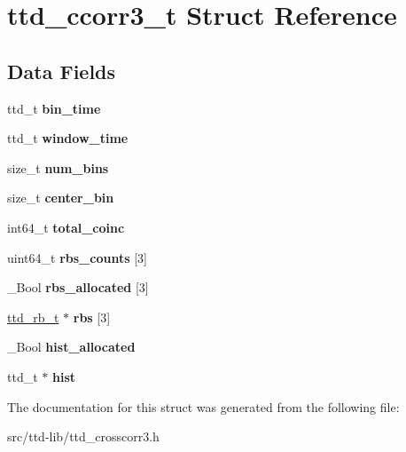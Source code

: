 \hypertarget{structttd__ccorr3__t}{}\section{ttd\+\_\+ccorr3\+\_\+t Struct Reference}
\label{structttd__ccorr3__t}
\subsection*{Data Fields}
\begin{DoxyCompactItemize}
\item 
\hypertarget{structttd__ccorr3__t_a1b78bd602c9780771a731ff59b39e214}{}ttd\+\_\+t {\bfseries bin\+\_\+time}\label{structttd__ccorr3__t_a1b78bd602c9780771a731ff59b39e214}

\item 
\hypertarget{structttd__ccorr3__t_ab3fdd8df8049f1fab663a27a9b4acfbb}{}ttd\+\_\+t {\bfseries window\+\_\+time}\label{structttd__ccorr3__t_ab3fdd8df8049f1fab663a27a9b4acfbb}

\item 
\hypertarget{structttd__ccorr3__t_a1fe4cf804dcccb4879c1834cbfd13d9c}{}size\+\_\+t {\bfseries num\+\_\+bins}\label{structttd__ccorr3__t_a1fe4cf804dcccb4879c1834cbfd13d9c}

\item 
\hypertarget{structttd__ccorr3__t_a932f1073e41399d43d4910d67677276d}{}size\+\_\+t {\bfseries center\+\_\+bin}\label{structttd__ccorr3__t_a932f1073e41399d43d4910d67677276d}

\item 
\hypertarget{structttd__ccorr3__t_a7808ee4e7455c7b5aad4f2c277cd69e3}{}int64\+\_\+t {\bfseries total\+\_\+coinc}\label{structttd__ccorr3__t_a7808ee4e7455c7b5aad4f2c277cd69e3}

\item 
\hypertarget{structttd__ccorr3__t_ae10696d3049f51f2e8bf4b6af043489e}{}uint64\+\_\+t {\bfseries rbs\+\_\+counts} \mbox{[}3\mbox{]}\label{structttd__ccorr3__t_ae10696d3049f51f2e8bf4b6af043489e}

\item 
\hypertarget{structttd__ccorr3__t_ae7a5e1c41a629cd3f598e24c5f6c5da0}{}\+\_\+\+Bool {\bfseries rbs\+\_\+allocated} \mbox{[}3\mbox{]}\label{structttd__ccorr3__t_ae7a5e1c41a629cd3f598e24c5f6c5da0}

\item 
\hypertarget{structttd__ccorr3__t_a5695c7e4aae5c5b724f2681d72c20720}{}\hyperlink{structttd__rb__t}{ttd\+\_\+rb\+\_\+t} $\ast$ {\bfseries rbs} \mbox{[}3\mbox{]}\label{structttd__ccorr3__t_a5695c7e4aae5c5b724f2681d72c20720}

\item 
\hypertarget{structttd__ccorr3__t_a91bd6b07487f5b6a35ca248fd5be900b}{}\+\_\+\+Bool {\bfseries hist\+\_\+allocated}\label{structttd__ccorr3__t_a91bd6b07487f5b6a35ca248fd5be900b}

\item 
\hypertarget{structttd__ccorr3__t_adb2b08f8c04f4a8ea4243ddda96c1bcf}{}ttd\+\_\+t $\ast$ {\bfseries hist}\label{structttd__ccorr3__t_adb2b08f8c04f4a8ea4243ddda96c1bcf}

\end{DoxyCompactItemize}


The documentation for this struct was generated from the following file\+:\begin{DoxyCompactItemize}
\item 
src/ttd-\/lib/ttd\+\_\+crosscorr3.\+h\end{DoxyCompactItemize}
